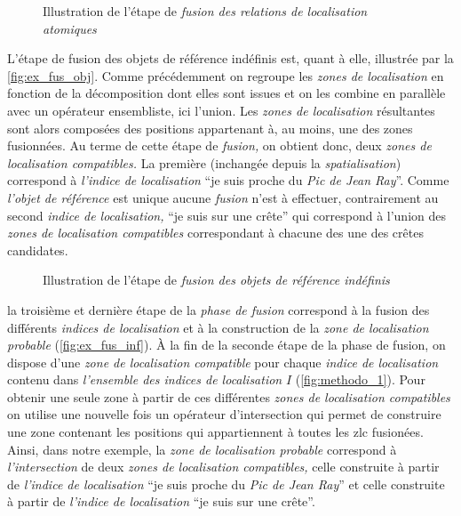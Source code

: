 \begin{figure}
  \centering
  
  \caption{Illustration de l'étape de \emph{fusion des relations de
      localisation atomiques}}
  \label{fig:ex_fus_rsa}
\end{figure}

L'étape de fusion des objets de référence indéfinis est, quant à elle,
illustrée par la \autoref{fig:ex_fus_obj}. Comme précédemment on
regroupe les \emph{zones de localisation} en fonction de la
décomposition dont elles sont issues et on les combine en parallèle
avec un opérateur ensembliste, ici l'union. Les \emph{zones de
  localisation} résultantes sont alors composées des positions
appartenant à, au moins, une des zones fusionnées. Au terme de cette
étape de \emph{fusion,} on obtient donc, deux \emph{zones de
  localisation compatibles.} La première (inchangée depuis la
\emph{spatialisation}) correspond à \emph{l'indice de localisation}
\enquote{je suis proche du \emph{Pic de Jean Ray}}. Comme
\emph{l'objet de référence} est unique aucune \emph{fusion} n'est à
effectuer, contrairement au second \emph{indice de localisation,}
\enquote{je suis sur une crête} qui correspond à l'union des
\emph{zones de localisation compatibles} correspondant à chacune des
une des crêtes candidates.

\begin{figure}
  \centering
  
  \caption{Illustration de l'étape de \emph{fusion des objets de
      référence indéfinis}}
  \label{fig:ex_fus_obj}
\end{figure}

la troisième et dernière étape de la \emph{phase de fusion} correspond
à la fusion des différents \emph{indices de localisation} et à la
construction de la \emph{zone de localisation probable}
(\autoref{fig:ex_fus_inf}). À la fin de la seconde étape de la phase
de fusion, on dispose d'une \emph{zone de localisation compatible}
pour chaque \emph{indice de localisation} contenu dans
\emph{l'ensemble des indices de localisation} \(I\)
(\autoref{fig:methodo_1}). Pour obtenir une seule zone à partir de ces
différentes \emph{zones de localisation compatibles} on utilise une
nouvelle fois un opérateur d'intersection qui permet de construire une
zone contenant les positions qui appartiennent à toutes les \ac{zlc}
fusionées. Ainsi, dans notre exemple, la \emph{zone de localisation
  probable} correspond à \emph{l'intersection} de deux \emph{zones de
  localisation compatibles,} celle construite à partir de
\emph{l'indice de localisation} \enquote{je suis proche du \emph{Pic
    de Jean Ray}} et celle construite à partir de \emph{l'indice de
  localisation} \enquote{je suis sur une crête}.

